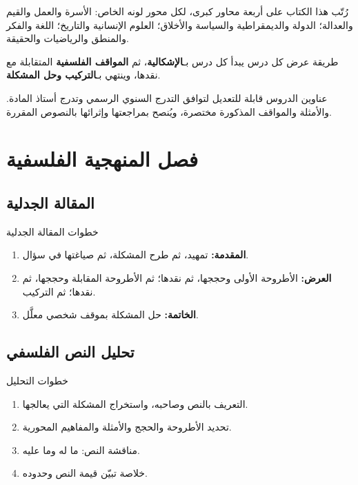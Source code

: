 \documentclass[12pt, twoside, openright]{book}
\begin{document}
رُتّب هذا الكتاب على أربعة محاور كبرى، لكل محور لونه الخاص: الأسرة والعمل والقيم والعدالة؛ الدولة والديمقراطية والسياسة والأخلاق؛ العلوم الإنسانية والتاريخ؛ اللغة والفكر والمنطق والرياضيات والحقيقة.

\begin{defbox}{طريقة عرض كل درس}
يبدأ كل درس بـ\textbf{الإشكالية}، ثم \textbf{المواقف الفلسفية} المتقابلة مع نقدها، وينتهي بـ\textbf{التركيب وحل المشكلة}.
\end{defbox}

\vspace{1em}
عناوين الدروس قابلة للتعديل لتوافق التدرج السنوي الرسمي وتدرج أستاذ المادة. والأمثلة والمواقف المذكورة مختصرة، ويُنصح بمراجعتها وإثرائها بالنصوص المقررة.

\tableofcontents

\chapter{فصل المنهجية الفلسفية}

\section{المقالة الجدلية}
\begin{defbox}{خطوات المقالة الجدلية}
\begin{enumerate}
  \item \textbf{المقدمة:} تمهيد، ثم طرح المشكلة، ثم صياغتها في سؤال.
  \item \textbf{العرض:} الأطروحة الأولى وحججها، ثم نقدها؛ ثم الأطروحة المقابلة وحججها، ثم نقدها؛ ثم التركيب.
  \item \textbf{الخاتمة:} حل المشكلة بموقف شخصي معلَّل.
\end{enumerate}
\end{defbox}

\section{تحليل النص الفلسفي}
\begin{defbox}{خطوات التحليل}
\begin{enumerate}
  \item التعريف بالنص وصاحبه، واستخراج المشكلة التي يعالجها.
  \item تحديد الأطروحة والحجج والأمثلة والمفاهيم المحورية.
  \item مناقشة النص: ما له وما عليه.
  \item خلاصة تبيّن قيمة النص وحدوده.
\end{enumerate}
\end{defbox}
\end{document}
